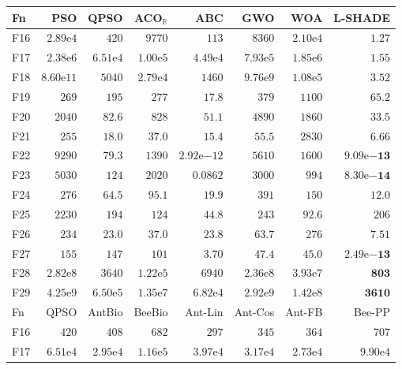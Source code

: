\begin{tabular}{lrrrrrrr}
\toprule
Fn & PSO & QPSO & ACO$_\mathbb{R}$ & ABC & GWO & WOA & L-SHADE \\
\midrule
F16 & $2.89\mathrm{e}{4}$ & $420$ & $9770$ & $113$ & $8360$ & $2.10\mathrm{e}{4}$ & $\mathbf{1.27}$ \\
F17 & $2.38\mathrm{e}{6}$ & $6.51\mathrm{e}{4}$ & $1.00\mathrm{e}{5}$ & $4.49\mathrm{e}{4}$ & $7.93\mathrm{e}{5}$ & $1.85\mathrm{e}{6}$ & $\mathbf{1.55}$ \\
F18 & $8.60\mathrm{e}{11}$ & $5040$ & $2.79\mathrm{e}{4}$ & $1460$ & $9.76\mathrm{e}{9}$ & $1.08\mathrm{e}{5}$ & $\mathbf{3.52}$ \\
F19 & $269$ & $195$ & $277$ & $\mathbf{17.8}$ & $379$ & $1100$ & $65.2$ \\
F20 & $2040$ & $82.6$ & $828$ & $51.1$ & $4890$ & $1860$ & $\mathbf{33.5}$ \\
F21 & $255$ & $18.0$ & $37.0$ & $15.4$ & $55.5$ & $2830$ & $\mathbf{6.66}$ \\
F22 & $9290$ & $79.3$ & $1390$ & $2.92\mathrm{e}{-12}$ & $5610$ & $1600$ & $\mathbf{9.09\mathrm{e}{-13}}$ \\
F23 & $5030$ & $124$ & $2020$ & $0.0862$ & $3000$ & $994$ & $\mathbf{8.30\mathrm{e}{-14}}$ \\
F24 & $276$ & $64.5$ & $95.1$ & $19.9$ & $391$ & $150$ & $\mathbf{12.0}$ \\
F25 & $2230$ & $194$ & $124$ & $\mathbf{44.8}$ & $243$ & $92.6$ & $206$ \\
F26 & $234$ & $23.0$ & $37.0$ & $23.8$ & $63.7$ & $276$ & $\mathbf{7.51}$ \\
F27 & $155$ & $147$ & $101$ & $3.70$ & $47.4$ & $45.0$ & $\mathbf{2.49\mathrm{e}{-13}}$ \\
F28 & $2.82\mathrm{e}{8}$ & $3640$ & $1.22\mathrm{e}{5}$ & $6940$ & $2.36\mathrm{e}{8}$ & $3.93\mathrm{e}{7}$ & $\mathbf{803}$ \\
F29 & $4.25\mathrm{e}{9}$ & $6.50\mathrm{e}{5}$ & $1.35\mathrm{e}{7}$ & $6.82\mathrm{e}{4}$ & $2.92\mathrm{e}{9}$ & $1.42\mathrm{e}{8}$ & $\mathbf{3610}$ \\
\midrule
Fn & QPSO & AntBio & BeeBio & Ant-Lin & Ant-Cos & Ant-FB & Bee-PP \\
\midrule
F16 & $420$ & $408$ & $682$ & $297$ & $345$ & $364$ & $707$ \\
F17 & $6.51\mathrm{e}{4}$ & $2.95\mathrm{e}{4}$ & $1.16\mathrm{e}{5}$ & $3.97\mathrm{e}{4}$ & $3.17\mathrm{e}{4}$ & $2.73\mathrm{e}{4}$ & $9.90\mathrm{e}{4}$ \\

\end{tabular}
